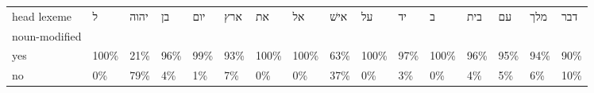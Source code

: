 \begin{table}[htbp!]
\centering
\label{table:all_nounmod_pr}
\begin{adjustbox}{width=1\textwidth}
\begin{tabular}{llllllllllllllll}
\toprule
head lexeme &     ל & יהוה &   בן &  יום &  ארץ &    את &    אל & אישׁ &    על &   יד &     ב &  בית &   עם &  מלך &  דבר \\
noun-modified &       &      &      &      &      &       &       &      &       &      &       &      &      &      &      \\
\midrule
yes           &  100\% &  21\% &  96\% &  99\% &  93\% &  100\% &  100\% &  63\% &  100\% &  97\% &  100\% &  96\% &  95\% &  94\% &  90\% \\
no            &    0\% &  79\% &   4\% &   1\% &   7\% &    0\% &    0\% &  37\% &    0\% &   3\% &    0\% &   4\% &   5\% &   6\% &  10\% \\
\bottomrule
\end{tabular}
\end{adjustbox}
\end{table}

